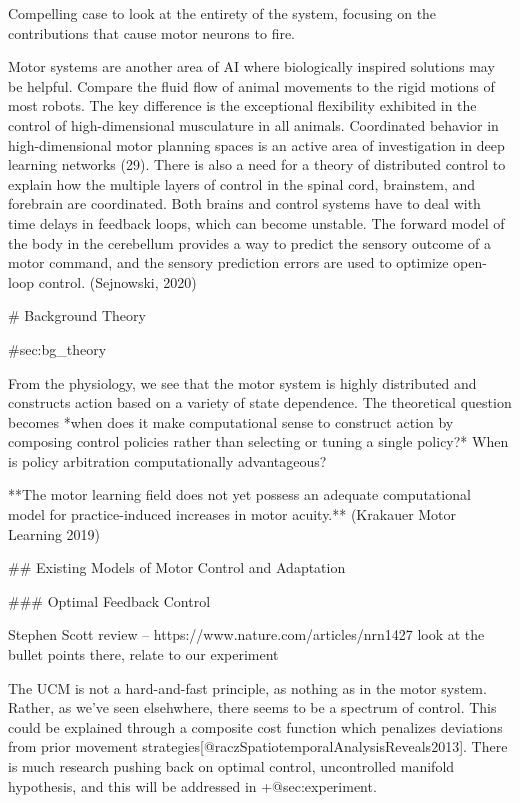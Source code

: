 \documentclass[../main.tex]{subfiles}
\begin{document}
{{{Compelling case to look at the entirety of the system, focusing on the contributions that cause motor neurons to fire.


 Motor systems are another area of AI where biologically inspired solutions may be helpful. Compare the fluid flow of animal movements to the rigid motions of most robots. The key difference is the exceptional flexibility exhibited in the control of high-dimensional musculature in all animals. Coordinated behavior in high-dimensional motor planning spaces is an active area of investigation in deep learning networks (29). There is also a need for a theory of distributed control to explain how the multiple layers of control in the spinal cord, brainstem, and forebrain are coordinated. Both brains and control systems have to deal with time delays in feedback loops, which can become unstable. The forward model of the body in the cerebellum provides a way to predict the sensory outcome of a motor command, and the sensory prediction errors are used to optimize open-loop control. (Sejnowski, 2020) 

# Background Theory

{#sec:bg_theory}

From the physiology, we see that the motor system is highly distributed and constructs action based on a variety of state dependence. The theoretical question becomes *when does it make computational sense to construct action by composing control policies rather than selecting or tuning a single policy?* When is policy arbitration computationally advantageous?

**The motor learning field does not yet possess an adequate computational model for practice-induced increases in motor acuity.** (Krakauer Motor Learning 2019)

## Existing Models of Motor Control and Adaptation

### Optimal Feedback Control

Stephen Scott review -- https://www.nature.com/articles/nrn1427 
look at the bullet points there, relate to our experiment

 The UCM is not a hard-and-fast principle, as nothing as in the motor system. Rather, as we've seen elsehwhere, there seems to be a spectrum of control. This could be explained through a composite cost function which penalizes deviations from prior movement strategies[@raczSpatiotemporalAnalysisReveals2013]. There is much research pushing back on optimal control, uncontrolled manifold hypothesis, and this will be addressed in {+@sec:experiment}. 


}}}
\end{document}
